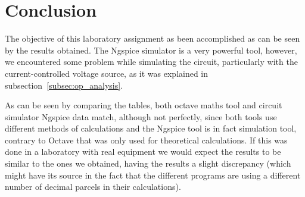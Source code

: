 \section{Conclusion}
\label{sec:conclusion}

\tab The objective of this laboratory assignment as been accomplished as can be seen by the results obtained. The Ngspice simulator is a very powerful tool, however, we encountered some problem while simulating the circuit, particularly with the current-controlled voltage source, as it was explained in subsection~\ref{subsec:op_analysis}.\par
As can be seen by comparing the tables, both octave maths tool and circuit simulator Ngspice data match, although not perfectly, since both tools use different methods of calculations and the Ngspice tool is in fact simulation tool, contrary to Octave that was only used for theoretical calculations. If this was done in a laboratory with real equipment we would expect the results to be similar to the ones we obtained, having the results a slight discrepancy (which might have its source in the fact that the different programs are using a different number of decimal parcels in their calculations).


